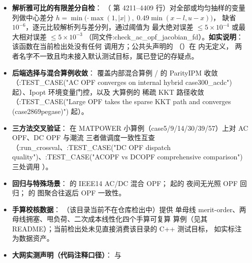 \begin{itemize}
  \item \textbf{解析雅可比的有限差分自检}：
        （
        第 4211--4409 行）对全部或均匀抽样的变量列做中心差分
        $h=\min($$\cdot\max(1,|x|),\;0.49\min(x-l,u-x))$，
         缺省 $10^{-6}$，逐元比较解析列与差分列，通过阈值为
        最大绝对误差 $\le5\times10^{-4}$ 或最大相对误差 $\le5\times10^{-3}$
        （同文件:check\_ac\_opf\_jacobian\_fd）。\textbf{如实说明}：该函数在当前检出处没有任何
        调用方；公共头声明的 
        （）在  内无定义，
        两者名字不一致且均未接入默认测试目标，属已登记的存疑点。
  \item \textbf{后端选择与混合算例收敛}：
        覆盖内部混合算例 / 的 ParityIPM
        收敛（:TEST\_CASE("AC OPF converges on internal hybrid case300\_acdc") 起）、Ipopt 环境变量门控，以及  大算例的
        稀疏 KKT 路径收敛（:TEST\_CASE("Large OPF takes the sparse KKT path and converges (case2869pegase)") 起）。
  \item \textbf{三方法交叉验证}：
        在 MATPOWER 小算例（case5/9/14/30/39/57）上对 AC OPF、DC OPF 与潮流
        三者做调度一致性互查（:run\_crossval、:TEST\_CASE("DC OPF dispatch quality")、:TEST\_CASE("ACOPF vs DCOPF comprehensive comparison") 三处调用 ）。
  \item \textbf{回归与特殊场景}： 的
        IEEE14 AC/DC 混合 OPF； 起的
        夜间无光照 OPF 回归； 的
        图聚合往返后 OPF 一致性。
  \item \textbf{手算校核数据}：
        （该目录当前不在仓库检出中）提供
        单母线 merit-order、两母线拥塞、甩负荷、二次成本线性化四个手算可复算
        算例（见其 README）；当前检出处未见直接消费该目录的 C++ 测试目标，
        如实标注为数据资产。
  \item \textbf{大网实测声明（代码注释口径）}： 与

\end{itemize}
